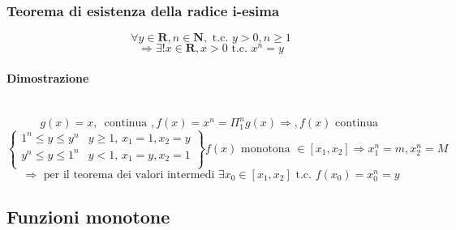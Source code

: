 \documentclass{report}
\newcommand{\subsubsubsection}[1]{\paragraph{#1}\mbox{}\\}
\begin{document}
        \subsubsection{Teorema di esistenza della radice i-esima}
            $$\forall y \in \mathbf{R}, n \in \mathbf{N}, \textrm{ t.c. } y > 0, n \geq 1$$
            $$\Longrightarrow \exists! x \in \mathbf{R}, x > 0 \textrm { t.c. } x^n = y$$
            \subsubsubsection{Dimostrazione}
            $$g\left(x\right) = x, \, \textrm{ continua }, f\left(x\right) = x^n = \Pi_{1}^{n}g\left(x\right)
                \Longrightarrow, f\left(x\right) \textrm{ continua }$$
            $$ \left\{\begin{matrix} 
                    1^n \leq y \leq y^n & y \geq 1, \, x_1 = 1, x_2 = y \\
                    y^n \leq y \leq 1^n & y < 1, \, x_1 = y, x_2 = 1 \\
                \end{matrix} \right\}
                f\left(x\right) \textrm{ monotona } \in \left[x_1, x_2\right] \Longrightarrow x_1^n = m, x_2^n = M
            $$
            $$\Longrightarrow \textrm{ per il teorema dei valori intermedi } \exists x_0 \in \left[x_1, x_2\right]
                \textrm{ t.c. } f\left(x_0\right) = x_0^n = y$$
    \subsection{Funzioni monotone}
\end{document}
